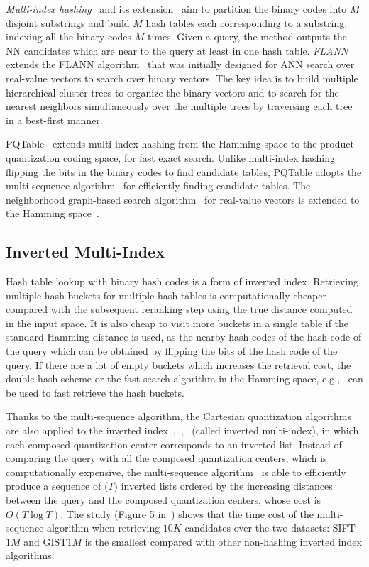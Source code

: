 \documentclass[10pt,journal,compsoc]{IEEEtran}
\begin{document}
\emph{Multi-index hashing}~\cite{NorouziPF12}
and its extension~\cite{SongSWHSW16} aim to
partition the binary codes into $M$ disjoint substrings
and build $M$ hash tables each corresponding to a substring,
indexing all the binary codes $M$ times.
Given a query,
the method outputs the NN candidates which are near to the query
at least in one hash table.
\emph{FLANN}~\cite{MujaL12} extends the FLANN algorithm~\cite{MujaL09}
that was initially designed for ANN search
over real-value vectors
to search over binary vectors.
The key idea is to build multiple hierarchical cluster trees to organize the binary vectors
and to search for the nearest neighbors
simultaneously over the multiple trees
by traversing each tree in a best-first manner.

PQTable~\cite{MatsuiYA15}
extends multi-index hashing
from the Hamming space to the product-quantization coding space,
for fast exact search.
Unlike multi-index hashing
flipping the bits in the binary codes
to find candidate tables,
PQTable adopts the multi-sequence algorithm~\cite{BabenkoL12}
for efficiently finding candidate tables.
The neighborhood graph-based search algorithm~\cite{WangL12}
for real-value vectors
is extended to the Hamming space~\cite{JiangXDXW16}.

\subsection{Inverted Multi-Index}
Hash table lookup with binary hash codes is
a form of inverted index.
Retrieving multiple hash buckets
for multiple hash tables
is computationally cheaper
compared with the subsequent reranking step
using the true distance computed in the input space.
It is also cheap
to visit more buckets in a single table
if the standard Hamming distance is used,
as the nearby hash codes of the hash code of the query
which can be obtained
by flipping the bits of the hash code of the query.
If there are a lot of empty buckets
which increases the retrieval cost,
the double-hash scheme or the fast search algorithm
in the Hamming space,
e.g.,~\cite{NorouziPF12, MujaL12}
can be used to fast retrieve the hash buckets.

Thanks to the multi-sequence algorithm,
the Cartesian quantization algorithms
are also applied to the inverted index~\cite{BabenkoL12},~\cite{ZhangQTW15},~\cite{GeHK013}
(called inverted multi-index),
in which each composed quantization center
corresponds to an inverted list.
Instead of comparing the query with all the composed quantization centers,
which is computationally expensive,
the multi-sequence algorithm~\cite{BabenkoL12} is able
to efficiently produce a sequence of ($T$) inverted lists
ordered by the increasing distances between the query
and the composed quantization centers,
whose cost is $O(T\log T)$.
The study (Figure 5 in~\cite{WangWZGLG13})
shows that the time cost of the multi-sequence algorithm
when retrieving $10K$ candidates over the two datasets: SIFT$1M$ and GIST$1M$
is the smallest compared with other non-hashing inverted index algorithms.
\end{document}
